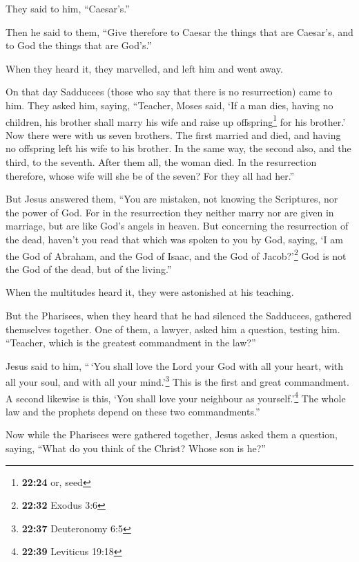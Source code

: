  They said to him, ``Caesar's.''

Then he said to them, ``Give therefore to Caesar the things that are
Caesar's, and to God the things that are God's.''

 When they heard it, they marvelled, and left him and
went away.

 On that day Sadducees (those who say that there is no
resurrection) came to him. They asked him,  saying,
``Teacher, Moses said, `If a man dies, having no children, his brother
shall marry his wife and raise up offspring\footnote{\textbf{22:24} or,
  seed} for his brother.'  Now there were with us seven
brothers. The first married and died, and having no offspring left his
wife to his brother.  In the same way, the second also,
and the third, to the seventh.  After them all, the woman
died.  In the resurrection therefore, whose wife will she
be of the seven? For they all had her.''

 But Jesus answered them, ``You are mistaken, not knowing
the Scriptures, nor the power of God.  For in the
resurrection they neither marry nor are given in marriage, but are like
God's angels in heaven.  But concerning the resurrection
of the dead, haven't you read that which was spoken to you by God,
saying,  `I am the God of Abraham, and the God of Isaac,
and the God of Jacob?'\footnote{\textbf{22:32} Exodus 3:6} God is not
the God of the dead, but of the living.''

 When the multitudes heard it, they were astonished at
his teaching.

 But the Pharisees, when they heard that he had silenced
the Sadducees, gathered themselves together.  One of
them, a lawyer, asked him a question, testing him. 
``Teacher, which is the greatest commandment in the law?''

 Jesus said to him, ``\,`You shall love the Lord your God
with all your heart, with all your soul, and with all your
mind.'\footnote{\textbf{22:37} Deuteronomy 6:5}  This is
the first and great commandment.  A second likewise is
this, `You shall love your neighbour as yourself.'\footnote{\textbf{22:39}
  Leviticus 19:18}  The whole law and the prophets depend
on these two commandments.''

 Now while the Pharisees were gathered together, Jesus
asked them a question,  saying, ``What do you think of
the Christ? Whose son is he?''


